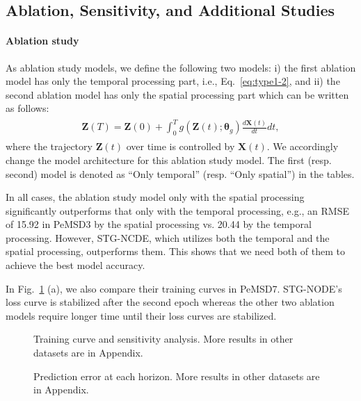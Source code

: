 \documentclass[letterpaper]{article} \usepackage{aaai22}  \usepackage{times}  \usepackage{helvet}  \usepackage{courier}  \usepackage[hyphens]{url}  \usepackage{graphicx} \urlstyle{rm} \def\UrlFont{\rm}  \usepackage{natbib}  \usepackage{caption} \DeclareCaptionStyle{ruled}{labelfont=normalfont,labelsep=colon,strut=off} \frenchspacing  \setlength{\pdfpagewidth}{8.5in}  \setlength{\pdfpageheight}{11in}  \usepackage{stfloats}
\begin{document}
\subsection{Ablation, Sensitivity, and Additional Studies}\label{sec:abl}
\paragraph{Ablation study} As ablation study models, we define the following two models: i) the first ablation model has only the temporal processing part, i.e., Eq.~\eqref{eq:type1-2}, and ii) the second ablation model has only the spatial processing part which can be written as follows:
\begin{align}\begin{split}
\bm{Z}(T) = \bm{Z}(0) + \int_{0}^{T} g(\bm{Z}(t);\bm{\theta}_g) \frac{d\bm{X}(t)}{dt} dt,\label{eq:abl}
\end{split}\end{align}where the trajectory $\bm{Z}(t)$ over time is controlled by $\bm{X}(t)$. We accordingly change the model architecture for this ablation study model. The first (resp. second) model is denoted as ``Only temporal'' (resp. ``Only spatial'') in the tables.

In all cases, the ablation study model only with the spatial processing significantly outperforms that only with the temporal processing, e.g., an RMSE of 15.92 in PeMSD3 by the spatial processing vs. 20.44 by the temporal processing. However, STG-NCDE, which utilizes both the temporal and the spatial processing, outperforms them. This shows that we need both of them to achieve the best model accuracy.

In Fig.~\ref{fig:loss_pemsd7} (a), we also compare their training curves in PeMSD7. STG-NODE's loss curve is stabilized after the second epoch whereas the other two ablation models require longer time until their loss curves are stabilized.

\begin{figure}[!t]
    \centering
    \caption{Training curve and sensitivity analysis. More results in other datasets are in Appendix.}
    \label{fig:loss_pemsd7}
\end{figure}

\begin{figure}[!t]
    \centering
    \caption{Prediction error at each horizon. More results in other datasets are in Appendix.}
    \label{fig:horizon}
\end{figure}
\end{document}
